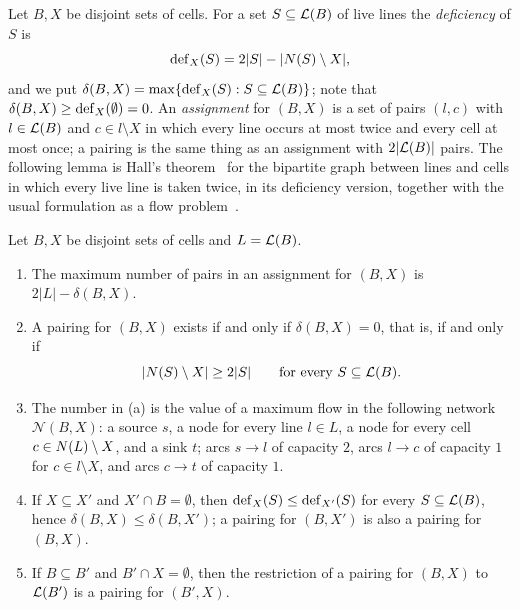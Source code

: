 Let $B,X$ be disjoint sets of cells. For a set $S\subseteq\mathcal{L}(B)$ of live lines the \emph{deficiency} of
$S$ is
\[
  \operatorname{def}_X(S)=2|S|-|N(S)\setminus X| ,
\]
and we put $\delta(B,X)=\max\{\operatorname{def}_X(S):S\subseteq\mathcal{L}(B)\}$; note that $\delta(B,X)\ge\operatorname{def}_X(\emptyset)=0$.
An \emph{assignment} for $(B,X)$ is a set of pairs $(l,c)$ with $l\in\mathcal{L}(B)$ and $c\in l\setminus X$ in
which every line occurs at most twice and every cell at most once; a pairing is the same thing as an
assignment with $2|\mathcal{L}(B)|$ pairs. The following lemma is Hall's theorem~\cite{Hall1935} for the
bipartite graph between lines and cells in which every live line is taken twice, in its deficiency
version, together with the usual formulation as a flow
problem~\cite{FordFulkerson1962,Schrijver2003}.

\begin{lemma}\label{lem:hall}
Let $B,X$ be disjoint sets of cells and $L=\mathcal{L}(B)$.
\begin{enumerate}[label=\textup{(\alph*)}]
\item The maximum number of pairs in an assignment for $(B,X)$ is $2|L|-\delta(B,X)$.
\item A pairing for $(B,X)$ exists if and only if $\delta(B,X)=0$, that is, if and only if
      \[
         |N(S)\setminus X|\ge 2|S|\qquad\text{for every } S\subseteq\mathcal{L}(B).
      \]
\item The number in \textup{(a)} is the value of a maximum flow in the following network $\mathcal N(B,X)$:
      a source $s$, a node for every line $l\in L$, a node for every cell $c\in N(L)\setminus X$, and a
      sink $t$; arcs $s\to l$ of capacity $2$, arcs $l\to c$ of capacity $1$ for $c\in l\setminus X$, and
      arcs $c\to t$ of capacity $1$.
\item If $X\subseteq X'$ and $X'\cap B=\emptyset$, then $\operatorname{def}_X(S)\le\operatorname{def}_{X'}(S)$ for every
      $S\subseteq\mathcal{L}(B)$, hence $\delta(B,X)\le\delta(B,X')$; a pairing for $(B,X')$ is also a pairing for
      $(B,X)$.
\item If $B\subseteq B'$ and $B'\cap X=\emptyset$, then the restriction of a pairing for $(B,X)$ to
      $\mathcal{L}(B')$ is a pairing for $(B',X)$.
\end{enumerate}
\end{lemma}

